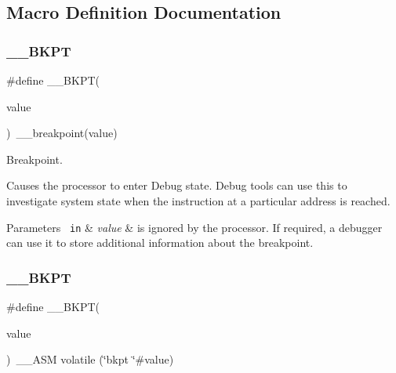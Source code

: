 \subsection{Macro Definition Documentation}
\mbox{\label{group___c_m_s_i_s___core___instruction_interface_ga15ea6bd3c507d3e81c3b3a1258e46397}} 
\subsubsection{\texorpdfstring{\_\_BKPT}{\_\_BKPT}\hspace{0.1cm}{\footnotesize\ttfamily [1/4]}}
{\footnotesize\ttfamily \#define \+\_\+\+\_\+\+B\+K\+PT(\begin{DoxyParamCaption}\item[{}]{value }\end{DoxyParamCaption})~\+\_\+\+\_\+breakpoint(value)}



Breakpoint. 

Causes the processor to enter Debug state. Debug tools can use this to investigate system state when the instruction at a particular address is reached. 
\begin{DoxyParams}[1]{Parameters}
\mbox{\texttt{ in}}  & {\em value} & is ignored by the processor. If required, a debugger can use it to store additional information about the breakpoint. \\
\hline
\end{DoxyParams}
\mbox{\label{group___c_m_s_i_s___core___instruction_interface_ga15ea6bd3c507d3e81c3b3a1258e46397}} 
\subsubsection{\texorpdfstring{\_\_BKPT}{\_\_BKPT}\hspace{0.1cm}{\footnotesize\ttfamily [2/4]}}
{\footnotesize\ttfamily \#define \+\_\+\+\_\+\+B\+K\+PT(\begin{DoxyParamCaption}\item[{}]{value }\end{DoxyParamCaption})~\+\_\+\+\_\+\+A\+SM volatile (\char`\"{}bkpt \char`\"{}\#value)}



